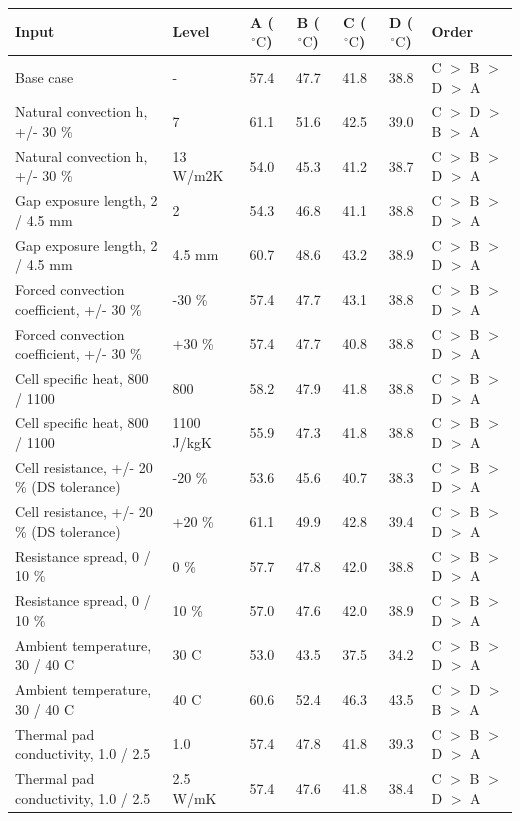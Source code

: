 \documentclass[11pt,a4paper]{article}
\newcommand{\degC}{\ensuremath{{}^{\circ}\mathrm{C}}}
\begin{document}
\begin{table}[H]
\centering\scriptsize
\begin{tabular}{@{}p{4.6cm}p{1.5cm}cccc>{\centering\arraybackslash}p{1.9cm}@{}}
\toprule
Input & Level & A (\degC) & B (\degC) & C (\degC) & D (\degC) & Order \\
\midrule
Base case & - & 57.4 & 47.7 & 41.8 & 38.8 & C $>$ B $>$ D $>$ A \\
Natural convection h, +/- 30 \% & 7 & 61.1 & 51.6 & 42.5 & 39.0 & C $>$ D $>$ B $>$ A \\
Natural convection h, +/- 30 \% & 13 W/m2K & 54.0 & 45.3 & 41.2 & 38.7 & C $>$ B $>$ D $>$ A \\
Gap exposure length, 2 / 4.5 mm & 2 & 54.3 & 46.8 & 41.1 & 38.8 & C $>$ B $>$ D $>$ A \\
Gap exposure length, 2 / 4.5 mm & 4.5 mm & 60.7 & 48.6 & 43.2 & 38.9 & C $>$ B $>$ D $>$ A \\
Forced convection coefficient, +/- 30 \% & -30 \% & 57.4 & 47.7 & 43.1 & 38.8 & C $>$ B $>$ D $>$ A \\
Forced convection coefficient, +/- 30 \% & +30 \% & 57.4 & 47.7 & 40.8 & 38.8 & C $>$ B $>$ D $>$ A \\
Cell specific heat, 800 / 1100 & 800 & 58.2 & 47.9 & 41.8 & 38.8 & C $>$ B $>$ D $>$ A \\
Cell specific heat, 800 / 1100 & 1100 J/kgK & 55.9 & 47.3 & 41.8 & 38.8 & C $>$ B $>$ D $>$ A \\
Cell resistance, +/- 20 \% (DS tolerance) & -20 \% & 53.6 & 45.6 & 40.7 & 38.3 & C $>$ B $>$ D $>$ A \\
Cell resistance, +/- 20 \% (DS tolerance) & +20 \% & 61.1 & 49.9 & 42.8 & 39.4 & C $>$ B $>$ D $>$ A \\
Resistance spread, 0 / 10 \% & 0 \% & 57.7 & 47.8 & 42.0 & 38.8 & C $>$ B $>$ D $>$ A \\
Resistance spread, 0 / 10 \% & 10 \% & 57.0 & 47.6 & 42.0 & 38.9 & C $>$ B $>$ D $>$ A \\
Ambient temperature, 30 / 40 C & 30 C & 53.0 & 43.5 & 37.5 & 34.2 & C $>$ B $>$ D $>$ A \\
Ambient temperature, 30 / 40 C & 40 C & 60.6 & 52.4 & 46.3 & 43.5 & C $>$ D $>$ B $>$ A \\
Thermal pad conductivity, 1.0 / 2.5 & 1.0 & 57.4 & 47.8 & 41.8 & 39.3 & C $>$ B $>$ D $>$ A \\
Thermal pad conductivity, 1.0 / 2.5 & 2.5 W/mK & 57.4 & 47.6 & 41.8 & 38.4 & C $>$ B $>$ D $>$ A \\

\end{tabular}
\end{table}
\end{document}
